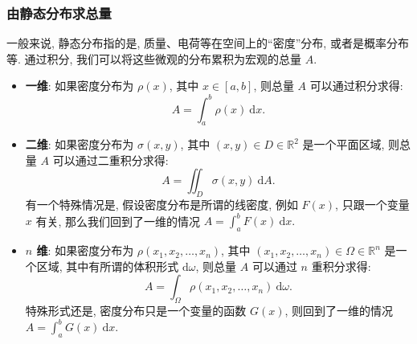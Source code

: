 \begin{frame}
\frametitle{由静态分布求总量}

一般来说, 静态分布指的是, 质量、电荷等在空间上的``密度''分布, 或者是概率分布等. 通过积分, 我们可以将这些微观的分布累积为宏观的总量 $A$.

\begin{itemize}[<+->]
\item \textbf{一维}: 如果密度分布为 $\rho(x)$, 其中 $x \in [a,b]$, 则总量 $A$ 可以通过积分求得:
\[
A = \int_a^b \rho(x) ~ \mathrm{d}x.
\]
\item \textbf{二维}: 如果密度分布为 $\sigma(x,y)$, 其中 $(x,y) \in D \in \mathbb{R}^2$ 是一个平面区域, 则总量 $A$ 可以通过二重积分求得:
\[
A = \iint_D \sigma(x,y) ~ \mathrm{d}A.
\]
有一个特殊情况是, 假设密度分布是所谓的线密度, 例如 $F(x)$, 只跟一个变量 $x$ 有关, 那么我们回到了一维的情况 $A = \int_a^b F(x) ~ \mathrm{d}x.$
\item \textbf{$n$ 维}: 如果密度分布为 $\rho(x_1, x_2, \ldots, x_n)$, 其中 $(x_1, x_2, \ldots, x_n) \in \Omega \in \mathbb{R}^n$ 是一个区域, 其中有所谓的体积形式 $\mathrm{d} \omega$, 则总量 $A$ 可以通过 $n$ 重积分求得:
\[
A = \int_\Omega \rho(x_1, x_2, \ldots, x_n) ~ \mathrm{d} \omega.
\]
特殊形式还是, 密度分布只是一个变量的函数 $G(x)$, 则回到了一维的情况 $A = \int_a^b G(x) ~ \mathrm{d}x.$
\end{itemize}

\end{frame}


